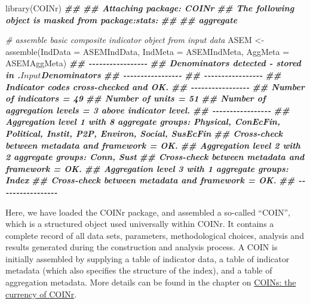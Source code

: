 \documentclass[
]{book}
\newenvironment{Shaded}{\begin{snugshade}}{\end{snugshade}}
\newcommand{\AttributeTok}[1]{\textcolor[rgb]{0.77,0.63,0.00}{#1}}
\newcommand{\CommentTok}[1]{\textcolor[rgb]{0.56,0.35,0.01}{\textit{#1}}}
\newcommand{\DocumentationTok}[1]{\textcolor[rgb]{0.56,0.35,0.01}{\textbf{\textit{#1}}}}
\newcommand{\FunctionTok}[1]{\textcolor[rgb]{0.00,0.00,0.00}{#1}}
\newcommand{\NormalTok}[1]{#1}
\newcommand{\OtherTok}[1]{\textcolor[rgb]{0.56,0.35,0.01}{#1}}
\begin{document}
\begin{Shaded}
\begin{Highlighting}[]
\FunctionTok{library}\NormalTok{(COINr)}
\DocumentationTok{\#\# }
\DocumentationTok{\#\# Attaching package: \textquotesingle{}COINr\textquotesingle{}}
\DocumentationTok{\#\# The following object is masked from \textquotesingle{}package:stats\textquotesingle{}:}
\DocumentationTok{\#\# }
\DocumentationTok{\#\#     aggregate}

\CommentTok{\# assemble basic composite indicator object from input data}
\NormalTok{ASEM }\OtherTok{\textless{}{-}} \FunctionTok{assemble}\NormalTok{(}\AttributeTok{IndData =}\NormalTok{ ASEMIndData,}
                 \AttributeTok{IndMeta =}\NormalTok{ ASEMIndMeta,}
                 \AttributeTok{AggMeta =}\NormalTok{ ASEMAggMeta)}
\DocumentationTok{\#\# {-}{-}{-}{-}{-}{-}{-}{-}{-}{-}{-}{-}{-}{-}{-}{-}{-}}
\DocumentationTok{\#\# Denominators detected {-} stored in .$Input$Denominators}
\DocumentationTok{\#\# {-}{-}{-}{-}{-}{-}{-}{-}{-}{-}{-}{-}{-}{-}{-}{-}{-}}
\DocumentationTok{\#\# {-}{-}{-}{-}{-}{-}{-}{-}{-}{-}{-}{-}{-}{-}{-}{-}{-}}
\DocumentationTok{\#\# Indicator codes cross{-}checked and OK.}
\DocumentationTok{\#\# {-}{-}{-}{-}{-}{-}{-}{-}{-}{-}{-}{-}{-}{-}{-}{-}{-}}
\DocumentationTok{\#\# Number of indicators = 49}
\DocumentationTok{\#\# Number of units = 51}
\DocumentationTok{\#\# Number of aggregation levels = 3 above indicator level.}
\DocumentationTok{\#\# {-}{-}{-}{-}{-}{-}{-}{-}{-}{-}{-}{-}{-}{-}{-}{-}{-}}
\DocumentationTok{\#\# Aggregation level 1 with 8 aggregate groups: Physical, ConEcFin, Political, Instit, P2P, Environ, Social, SusEcFin}
\DocumentationTok{\#\# Cross{-}check between metadata and framework = OK.}
\DocumentationTok{\#\# Aggregation level 2 with 2 aggregate groups: Conn, Sust}
\DocumentationTok{\#\# Cross{-}check between metadata and framework = OK.}
\DocumentationTok{\#\# Aggregation level 3 with 1 aggregate groups: Index}
\DocumentationTok{\#\# Cross{-}check between metadata and framework = OK.}
\DocumentationTok{\#\# {-}{-}{-}{-}{-}{-}{-}{-}{-}{-}{-}{-}{-}{-}{-}{-}{-}}
\end{Highlighting}
\end{Shaded}

Here, we have loaded the COINr package, and assembled a so-called ``COIN'', which is a structured object used universally within COINr. It contains a complete record of all data sets, parameters, methodological choices, analysis and results generated during the construction and analysis process. A COIN is initially assembled by supplying a table of indicator data, a table of indicator metadata (which also specifies the structure of the index), and a table of aggregation metadata. More details can be found in the chapter on \protect\hyperlink{coins-the-currency-of-coinr}{COINs: the currency of COINr}.
\end{document}
